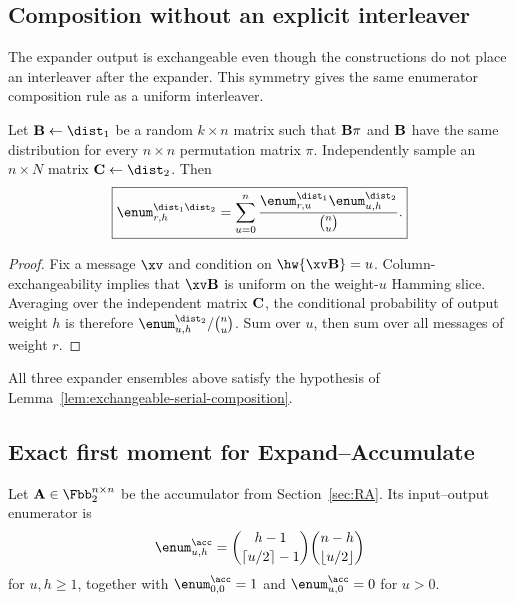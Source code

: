 \subsection{Composition without an explicit interleaver}

The expander output is exchangeable even though the constructions do not place
an interleaver after the expander.  This symmetry gives the same enumerator
composition rule as a uniform interleaver.

\begin{lemma}
\label{lem:exchangeable-serial-composition}
Let $\B\gets\dist_1$ be a random $k\times n$ matrix such that
$\mathbf B\pi$ and $\mathbf B$ have the same distribution for every $n\times n$ permutation
matrix $\pi$.  Independently sample an $n\times N$ matrix
$\C\gets\dist_2$.  Then
\begin{equation}
 \boxed{
 \enum^{\dist_1\dist_2}_{r,h}
   =
 \sum_{u=0}^{n}
 \frac{\enum^{\dist_1}_{r,u}\enum^{\dist_2}_{u,h}}
      {\binom{n}{u}}.
 }
 \label{eq:exchangeable-serial-composition}
\end{equation}
\end{lemma}

\begin{proof}
Fix a message $\xv$ and condition on $\hw{\xv\B}=u$.  Column-exchangeability
implies that $\xv\B$ is uniform on the weight-$u$ Hamming slice.  Averaging
over the independent matrix $\mathbf C$, the conditional probability of output
weight $h$ is therefore
$\enum^{\dist_2}_{u,h}/\binom{n}{u}$.  Sum over $u$, then sum over all messages
of weight $r$.
\end{proof}

All three expander ensembles above satisfy the hypothesis of
Lemma~\ref{lem:exchangeable-serial-composition}.

\subsection{Exact first moment for Expand--Accumulate}

Let $\A\in\Fbb_2^{n\times n}$ be the accumulator from
Section~\ref{sec:RA}.  Its input--output enumerator is
\begin{equation}
 \enum^{\acc}_{u,h}
   =
 \binom{h-1}{\lceil u/2\rceil-1}
 \binom{n-h}{\lfloor u/2\rfloor}
 \label{eq:accumulator-enumerator-recalled}
\end{equation}
for $u,h\geq 1$, together with
$\enum^{\acc}_{0,0}=1$ and $\enum^{\acc}_{u,0}=0$ for $u>0$.


